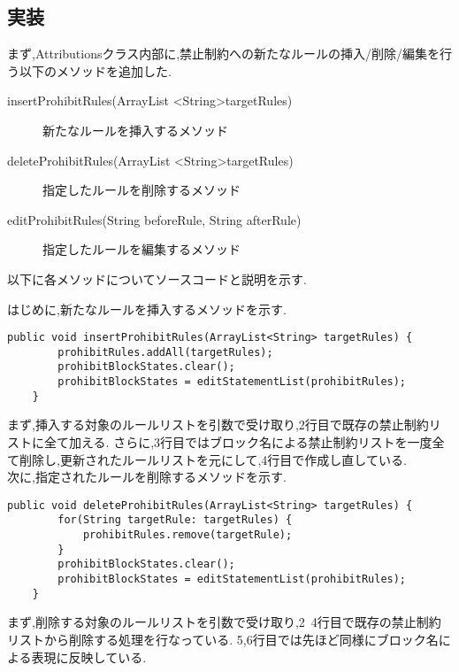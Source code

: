 \documentclass[uplatex,12pt]{jsarticle}
\begin{document}

\subsection{実装}
まず,Attributionsクラス内部に,禁止制約への新たなルールの挿入/削除/編集を行う以下のメソッドを追加した.
\begin{description}
\item[insertProhibitRules(ArrayList \textless String\textgreater targetRules)] 新たなルールを挿入するメソッド
\item[deleteProhibitRules(ArrayList \textless String\textgreater targetRules)] 指定したルールを削除するメソッド
\item[editProhibitRules(String beforeRule, String afterRule)] 指定したルールを編集するメソッド
\end{description}
以下に各メソッドについてソースコードと説明を示す.

はじめに,新たなルールを挿入するメソッドを示す.
\begin{lstlisting}[caption=insertProhibitRulesメソッドの実装, label=mid]
    public void insertProhibitRules(ArrayList<String> targetRules) {
		prohibitRules.addAll(targetRules);
		prohibitBlockStates.clear();
		prohibitBlockStates = editStatementList(prohibitRules);
	}
\end{lstlisting}
まず,挿入する対象のルールリストを引数で受け取り,2行目で既存の禁止制約リストに全て加える.
さらに,3行目ではブロック名による禁止制約リストを一度全て削除し,更新されたルールリストを元にして,4行目で作成し直している. \\

次に,指定されたルールを削除するメソッドを示す.
\begin{lstlisting}[caption=deleteProhibitRulesメソッドの実装, label=mid]
    public void deleteProhibitRules(ArrayList<String> targetRules) {
		for(String targetRule: targetRules) {
			prohibitRules.remove(targetRule);
		}
		prohibitBlockStates.clear();
		prohibitBlockStates = editStatementList(prohibitRules);
	}
\end{lstlisting}
まず,削除する対象のルールリストを引数で受け取り,2~4行目で既存の禁止制約リストから削除する処理を行なっている.
5,6行目では先ほど同様にブロック名による表現に反映している. \\
\end{document}
